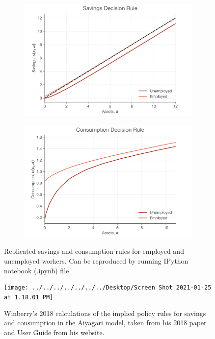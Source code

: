 \documentclass[11pt]{article}
\begin{document}
\begin{figure}[htp]
\begin{subfigure}{.5\textwidth}
\centering
\includegraphics[scale=.45]{../Figures/save_rule.png}

\end{subfigure}
\begin{subfigure}{.5\textwidth}
\centering
\includegraphics[scale=.45]{../Figures/cons_rule.png}
\end{subfigure}
\caption{Replicated savings and consumption rules for employed and unemployed workers. Can be reproduced by running IPython notebook (.ipynb) file  }
\label{con_sav_rep}
\vspace*{\floatsep}
\centering
\texttt{[image: ../../../../../../../Desktop/Screen Shot 2021-01-25 at 1.18.01 PM]}
\caption{Winberry's 2018 calculations of the implied policy rules for savings and consumption in the Aiyagari model, taken from his 2018 paper and User Guide from his website.}
\label{con_sav_orig}
\end{figure}	
\end{document}
